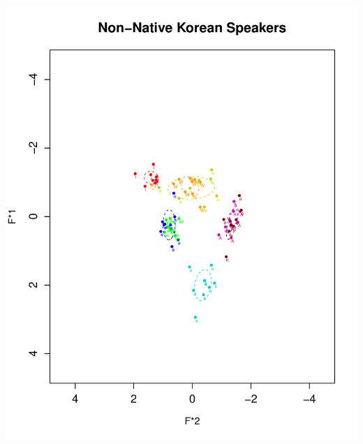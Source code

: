 \documentclass[man, fleqn, noextraspace]{apa6}
\begin{document}
\includegraphics{Group_5_Final_paper_files/figure-latex/Vowel Charts of All Speakers-2.pdf}
\end{document}
